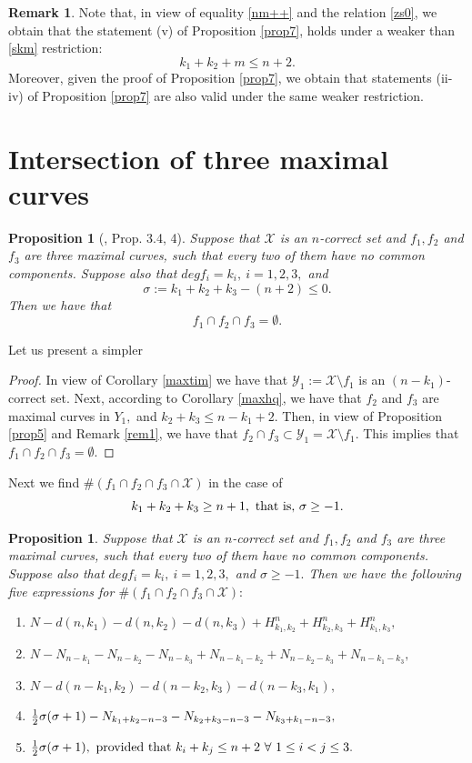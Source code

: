 \documentclass[a4paper,12pt]{article}
\newtheorem{proposition}[lemma]{Proposition}
\theoremstyle{definition}
\newtheorem{remark}[lemma]{Remark}
\numberwithin{equation}{section}
\numberwithin{figure}{section}
\newcommand{\Xset}{\mathcal{X}}
\newcommand{\Yset}{\mathcal{Y}}
\begin{document}
\begin{remark} \label{rem2} Note that, in view of equality \eqref{nm++} and the relation \eqref{zs0}, we obtain that the statement (v) of Proposition \ref{prop7}, holds under a weaker than \eqref{skm} restriction: 
$$k_1+k_2+m\le n+2.$$ 
Moreover, given the proof of Proposition \ref{prop7}, we obtain that statements (ii-iv) of Proposition \ref{prop7} are also valid under the same weaker restriction.\end{remark} 
\section{Intersection of three maximal curves}
\begin{proposition}[\cite{Raf}, Prop. 3.4, 4] \label{prop10}
Suppose that $\Xset$ is an $n$-correct set and $f_1, f_2$ and $f_3$ are
three maximal curves, such that every two of them have no common components.  
Suppose also that $deg f_i=k_i, \ i=1,2,3,$ and $$\sigma:=k_1+k_2+k_3-(n+2)\le 0.$$ Then we have that
$$f_1\cap f_2\cap f_3=\emptyset.$$
\end{proposition}
Let us present a simpler 
\begin{proof}
In view of Corollary  \ref{maxtim} we have that
        	$\Yset_1 := \Xset \setminus f_1$ is an $(n-k_1)$-correct set. Next, according to Corollary \ref{maxhq}, we have that
        	$f_2$ and $f_3$ are maximal curves in $Y_1,$ and $k_2+k_3\le n-k_1+2.$  Then, in view of Proposition \ref{prop5} and Remark \ref{rem1}, we have that $f_2\cap f_3\subset \Yset_1= \Xset \setminus f_1.$ This implies that $f_1\cap f_2\cap f_3=\emptyset.$
\end{proof}
Next we find $\#(f_1\cap f_2\cap f_3 \cap \Xset)$ in the case of 
$$k_1+k_2+k_3\ge n+1,\ \hbox{that is,}\ \sigma\ge -1.$$
\begin{proposition} \label{prop1011}
Suppose that $\Xset$ is an $n$-correct set and $f_1, f_2$ and $f_3$ are
three maximal curves, such that every two of them have no common components. Suppose also that $deg f_i=k_i, \ i=1,2,3,$ and $\sigma\ge -1.$
Then we have the following five expressions for $\#(f_1\cap f_2\cap f_3 \cap \Xset):$
\begin{enumerate}
\item
$N-d(n,k_1)-d(n,k_2)-d(n,k_3)+H_{k_1,k_2}^n+H_{k_2,k_3}^n+H_{k_1,k_3}^n,$
\item
$N-N_{n-k_1}-N_{n-k_2}-N_{n-k_3}+N_{n-k_1-k_2}+N_{n-k_2-k_3}+N_{n-k_1-k_3},$
\item
$N-d(n-k_1, k_2)-d(n-k_2,k_3)-d(n-k_3,k_1),$
\item
${1\over 2} \sigma(\sigma+1)-N_{k_1+k_2-n-3}-N_{k_2+k_3-n-3}-N_{k_3+k_1-n-3},$
\item
${1\over 2} \sigma(\sigma+1),\ \hbox{provided that}\  k_i+k_j\le n+2\ \forall\ 1\le i<j\le 3.$ 
\end{enumerate}

\end{proposition}
\end{document}
